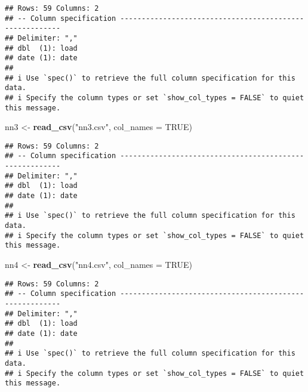 \documentclass[
]{article}
\newenvironment{Shaded}{\begin{snugshade}}{\end{snugshade}}
\newcommand{\AttributeTok}[1]{\textcolor[rgb]{0.13,0.29,0.53}{#1}}
\newcommand{\ConstantTok}[1]{\textcolor[rgb]{0.56,0.35,0.01}{#1}}
\newcommand{\FunctionTok}[1]{\textcolor[rgb]{0.13,0.29,0.53}{\textbf{#1}}}
\newcommand{\NormalTok}[1]{#1}
\newcommand{\OtherTok}[1]{\textcolor[rgb]{0.56,0.35,0.01}{#1}}
\newcommand{\StringTok}[1]{\textcolor[rgb]{0.31,0.60,0.02}{#1}}
\begin{document}
\begin{verbatim}
## Rows: 59 Columns: 2
## -- Column specification --------------------------------------------------------
## Delimiter: ","
## dbl  (1): load
## date (1): date
## 
## i Use `spec()` to retrieve the full column specification for this data.
## i Specify the column types or set `show_col_types = FALSE` to quiet this message.
\end{verbatim}

\begin{Shaded}
\begin{Highlighting}[]
\NormalTok{nn3 }\OtherTok{\textless{}{-}} \FunctionTok{read\_csv}\NormalTok{(}\StringTok{"nn3.csv"}\NormalTok{, }\AttributeTok{col\_names =} \ConstantTok{TRUE}\NormalTok{)}
\end{Highlighting}
\end{Shaded}

\begin{verbatim}
## Rows: 59 Columns: 2
## -- Column specification --------------------------------------------------------
## Delimiter: ","
## dbl  (1): load
## date (1): date
## 
## i Use `spec()` to retrieve the full column specification for this data.
## i Specify the column types or set `show_col_types = FALSE` to quiet this message.
\end{verbatim}

\begin{Shaded}
\begin{Highlighting}[]
\NormalTok{nn4 }\OtherTok{\textless{}{-}} \FunctionTok{read\_csv}\NormalTok{(}\StringTok{"nn4.csv"}\NormalTok{, }\AttributeTok{col\_names =} \ConstantTok{TRUE}\NormalTok{)}
\end{Highlighting}
\end{Shaded}

\begin{verbatim}
## Rows: 59 Columns: 2
## -- Column specification --------------------------------------------------------
## Delimiter: ","
## dbl  (1): load
## date (1): date
## 
## i Use `spec()` to retrieve the full column specification for this data.
## i Specify the column types or set `show_col_types = FALSE` to quiet this message.
\end{verbatim}
\end{document}
